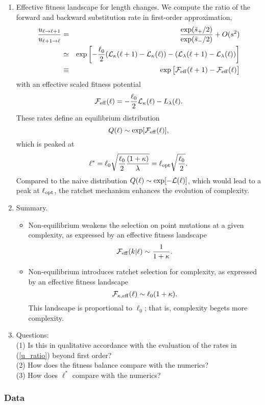 \documentclass[10pt,a4paper]{article}
\renewcommand{\L}{{\cal L}}
\newcommand{\F}{{\cal F}}
\newcommand{\EQ}{\begin{equation}}
\newcommand{\EE}{\end{equation}}
\newcommand{\EQA}{\begin{eqnarray}}
\newcommand{\EEA}{\end{eqnarray}}
\begin{document}
{\begin{enumerate}
\item Effective fitness landscape for length changes. We compute the ratio of the forward and backward substitution rate in first-order approximation,
\EQA
\frac{u_{\ell \to \ell+1}}{u_{\ell + 1 \to \ell}} & = & \frac{\exp(\bar s_+/2)}{\exp(\bar s_-/2)} +O(s^2)
\\
& \simeq & \exp \left [ - \frac{\ell_0}{2} (\L_\kappa (\ell+1) - \L_\kappa (\ell)) - (\L_\lambda (\ell+1) - \L_\lambda (\ell)) \right ]
\\
& \equiv & \exp \big [ \F_{\rm eff} (\ell+1) - \F_{\rm eff} (\ell) \big ]
\label{u_ratio}
\EEA
with an effective scaled fitness potential
\EQ
\F_{\rm eff} (\ell) = - \frac{\ell_0}{2} \L_\kappa (\ell) - L_\lambda (\ell) .
 \EE
These rates define an equilibrium distribution
\EQ
Q(\ell) \sim \exp [ \F_{\rm eff} (\ell)],
\EE
which is peaked at
\EQ
\ell^* = \ell_0 \sqrt{ \frac{\ell_0}{2} \frac{(1+\kappa)}{\lambda}} = \ell_{\rm opt} \sqrt{ \frac{\ell_0}{2}} .
\EE
Compared to the naive distribution $Q(\ell) \sim \exp [ - \L (\ell)]$, which would lead to a peak at $\ell_{\rm opt}$, the ratchet mechanism enhances the evolution of complexity.

\item Summary.
\begin{itemize}
\item Non-equilibrium weakens the selection on point mutations at a given complexity, as expressed by an effective fitness landscape
\EQ
\F_{\rm eff} (k|\ell) \sim \frac{1}{1 + \kappa} .
\EE
\item Non-equilibrium introduces ratchet selection for complexity, as expressed by an effective fitness landscape
\EQ
\F_{\kappa, \rm eff} (\ell) \sim \ell_0(1+ \kappa).
\EE
This landscape is proportional to $\ell_0$; that is, complexity begets more complexity.
\end{itemize}

\item Questions:\\
(1) Is this in qualitative accordance with the evaluation of the rates in (\ref{u_ratio}) beyond first order?
\\
(2) How does the fitness balance compare with the numerics?
\\
(3) How does $\ell^*$ compare with the numerics?
\end{enumerate}
}

	\subsubsection*{Data}
\end{document}
